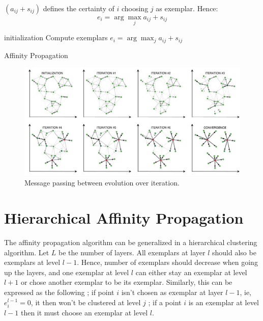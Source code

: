 \documentclass{ipol}
\begin{document}
$(a_{ij} + s_{ij})$ defines the certainty of $i$ choosing $j$ as exemplar.
Hence:
\begin{equation*}
e_i = \arg \max_j a_{ij} + s_{ij}
\end{equation*}

\begin{algorithm}[h]
  \SetLine
  initialization\;
  Compute exemplars $e_i = \arg \max_{j} a_{ij} + s_{ij}$ \;
  \caption{Affinity Propagation}
\end{algorithm}

\begin{figure}
\includegraphics[width=500px]{./images/AP_frey.png}
\caption{Message passing between evolution over iteration.}
\end{figure}

\section{Hierarchical Affinity Propagation}

The affinity propagation algorithm can be generalized in a hierarchical
clustering algorithm. Let $L$ be the number of layers. All exemplars at layer
$l$ should also be exemplars at level $l -1$. Hence, number of exemplars
should decrease when going up the layers, and one exemplar at level $l$ can
either stay an exemplar at level $l + 1$ or chose another exemplar to be its
exemplar. Similarly, this can be expressed as the following ; if point $i$ isn't chosen as
exemplar at layer $l - 1$, ie, $e_{i}^{l - 1} = 0$, it then won't be clustered at
level $j$ ; if a point $i$ is an exemplar at level $l -1$ then it must choose
an exemplar at level $l$.\\
\end{document}
